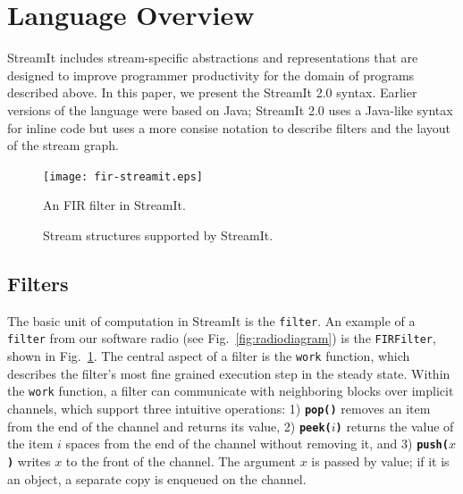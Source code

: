 \section{Language Overview}
\label{sec:overview}

StreamIt includes stream-specific abstractions and representations
that are designed to improve programmer productivity for the domain of
programs described above.  In this paper, we present the StreamIt 2.0
syntax.  Earlier versions of the language were based on Java; StreamIt
2.0 uses a Java-like syntax for inline code but uses a more consise
notation to describe filters and the layout of the stream graph.

\begin{figure}
\centering
\texttt{[image: fir-streamit.eps]}
\caption{An FIR filter in StreamIt.}
\label{fig:firstreamit}
\end{figure}

\begin{figure}
\centering
{}
\caption{Stream structures supported by StreamIt.}
\label{fig:structuresp}
\end{figure}

\subsection{Filters}

The basic unit of computation in StreamIt is the \texttt{filter}.  An
example of a \texttt{filter} from our software radio (see
Fig.~\ref{fig:radiodiagram}) is the \texttt{FIRFilter}, shown in
Fig.~\ref{fig:firstreamit}.  The central aspect of a filter is the
\texttt{work} function, which describes the filter's most fine grained
execution step in the steady state.  Within the \texttt{work}
function, a filter can communicate with neighboring blocks over
implicit channels, which support three intuitive operations: 1)
\textbf{\texttt{pop()}} removes an item from the end of the channel
and returns its value, 2) \textbf{\texttt{peek($i$)}} returns the
value of the item $i$ spaces from the end of the channel without
removing it, and 3) \textbf{\texttt{push($x$)}} writes $x$ to the
front of the channel.  The argument $x$ is passed by value; if it is
an object, a separate copy is enqueued on the channel.

